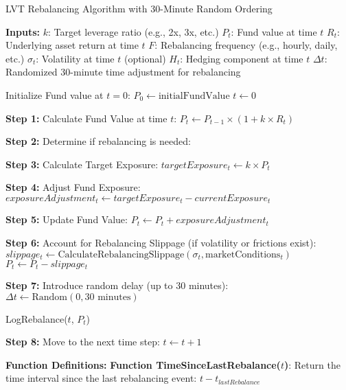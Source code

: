 
\begin{algorithm}
	\caption{LVT Rebalancing Algorithm with 30-Minute Random Ordering}
	\begin{algorithmic}[1]\label{alg:rebalancing}
		\STATE \textbf{Inputs:}
		\STATE $k$: Target leverage ratio (e.g., 2x, 3x, etc.)
		\STATE $P_t$: Fund value at time $t$
		\STATE $R_t$: Underlying asset return at time $t$
		\STATE $F$: Rebalancing frequency (e.g., hourly, daily, etc.)
		\STATE $\sigma_t$: Volatility at time $t$ (optional)
		\STATE $H_t$: Hedging component at time $t$
		\STATE $\Delta t$: Randomized 30-minute time adjustment for rebalancing
		
		\STATE Initialize Fund value at $t = 0$: $P_0 \gets \text{initialFundValue}$
		\STATE $t \gets 0$
		
		
		\STATE \textbf{Step 1:} Calculate Fund Value at time $t$:
		\STATE $P_t \gets P_{t-1} \times (1 + k \times R_t)$
		
		\STATE \textbf{Step 2:} Determine if rebalancing is needed:
		
		\STATE \textbf{Step 3:} Calculate Target Exposure:
		\STATE $targetExposure_t \gets k \times P_t$
		
		\STATE \textbf{Step 4:} Adjust Fund Exposure:
		\STATE $exposureAdjustment_t \gets targetExposure_t - currentExposure_t$
		
		\STATE \textbf{Step 5:} Update Fund Value:
		\STATE $P_t \gets P_t + exposureAdjustment_t$
		
		\STATE \textbf{Step 6:} Account for Rebalancing Slippage (if volatility or frictions exist):
		\STATE $slippage_t \gets \text{CalculateRebalancingSlippage}(\sigma_t, \text{marketConditions}_t)$
		\STATE $P_t \gets P_t - slippage_t$
		\ENDIF
		
		\STATE \textbf{Step 7:} Introduce random delay (up to 30 minutes):
		\STATE $\Delta t \gets \text{Random}(0, 30 \text{ minutes})$
		
		\STATE LogRebalance($t$, $P_t$)
		
		\ENDIF
		
		\STATE \textbf{Step 8:} Move to the next time step:
		\STATE $t \gets t + 1$
		
		\ENDWHILE
		
		\STATE \textbf{Function Definitions:}
		\STATE \textbf{Function TimeSinceLastRebalance($t$)}:
		\STATE \quad Return the time interval since the last rebalancing event: $t - t_{lastRebalance}$
		

\end{algorithmic}
\end{algorithm}
